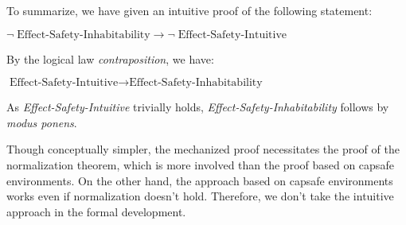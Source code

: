 To summarize, we have given an intuitive proof of the following
statement:

\begin{center}
  $\neg \; \text{Effect-Safety-Inhabitability} \to \neg \;
  \text{Effect-Safety-Intuitive}$
\end{center}

By the logical law \emph{contraposition}, we have:

\begin{center}
  $ \text{Effect-Safety-Intuitive} \to
  \text{Effect-Safety-Inhabitability} $
\end{center}

As \emph{Effect-Safety-Intuitive} trivially holds,
\emph{Effect-Safety-Inhabitability} follows by \emph{modus ponens}.

Though conceptually simpler, the mechanized proof necessitates the
proof of the normalization theorem, which is more involved than the
proof based on capsafe environments. On the other hand, the approach
based on capsafe environments works even if normalization doesn't
hold. Therefore, we don't take the intuitive approach in the formal
development.

